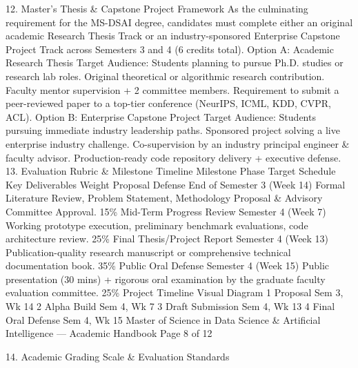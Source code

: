 12. Master's Thesis \& Capstone Project Framework
As the culminating requirement for the MS-DSAI degree, candidates must complete either an original academic
Research Thesis Track or an industry-sponsored Enterprise Capstone Project Track across Semesters 3 and 4 (6
credits total).
Option A: Academic Research Thesis
Target Audience: Students planning to pursue Ph.D.
studies or research lab roles.
Original theoretical or algorithmic research contribution.
Faculty mentor supervision + 2 committee members.
Requirement to submit a peer-reviewed paper to a top-tier
conference (NeurIPS, ICML, KDD, CVPR, ACL).
Option B: Enterprise Capstone Project
Target Audience: Students pursuing immediate industry
leadership paths.
Sponsored project solving a live enterprise industry
challenge.
Co-supervision by an industry principal engineer \& faculty
advisor.
Production-ready code repository delivery + executive
defense.
13. Evaluation Rubric \& Milestone Timeline
Milestone Phase
Target Schedule
Key Deliverables
Weight
Proposal Defense
End of Semester 3
(Week 14)
Formal Literature Review, Problem Statement, Methodology
Proposal \& Advisory Committee Approval.
15\%
Mid-Term Progress
Review
Semester 4 (Week 7)
Working prototype execution, preliminary benchmark evaluations,
code architecture review.
25\%
Final Thesis/Project
Report
Semester 4 (Week
13)
Publication-quality research manuscript or comprehensive
technical documentation book.
35\%
Public Oral Defense
Semester 4 (Week
15)
Public presentation (30 mins) + rigorous oral examination by the
graduate faculty evaluation committee.
25\%
Project Timeline Visual Diagram
1
Proposal
Sem 3, Wk 14
2
Alpha Build
Sem 4, Wk 7
3
Draft Submission
Sem 4, Wk 13
4
Final Oral Defense
Sem 4, Wk 15
Master of Science in Data Science \& Artificial Intelligence — Academic Handbook
Page 8 of 12

14. Academic Grading Scale \& Evaluation Standards

